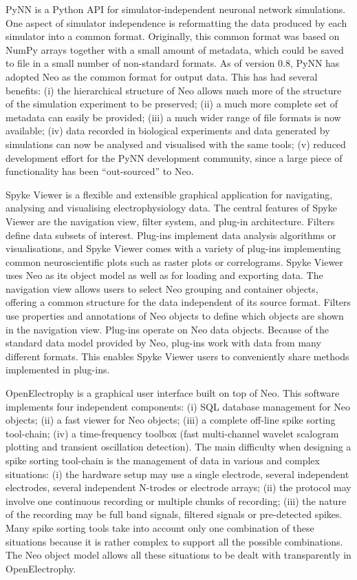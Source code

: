 \documentclass{frontiers}
\begin{document}
PyNN \citep{Davison2009} is a Python API for simulator-independent neuronal network simulations.
One aspect of simulator independence is reformatting the data produced by each simulator into a common format.
Originally, this common format was based on NumPy arrays together with a small amount of metadata, which could be saved to file in a small number of non-standard formats.
As of version 0.8, PyNN has adopted Neo as the common format for output data.
This has had several benefits:
  (i)   the hierarchical structure of Neo allows much more of the structure of the simulation experiment to be preserved;
  (ii)  a much more complete set of metadata can easily be provided;
  (iii) a much wider range of file formats is now available;
  (iv)  data recorded in biological experiments and data generated by simulations can now be analysed and visualised with the same tools; 
  (v)   reduced development effort for the PyNN development community, since a large piece of functionality has been ``out-sourced'' to Neo.

Spyke Viewer \citep{Proepper2013} is a flexible and extensible graphical application for navigating, analysing and visualising electrophysiology data. 
The central features of Spyke Viewer are the navigation view, filter system, and plug-in architecture.
Filters define data subsets of interest.
Plug-ins implement data analysis algorithms or visualisations, and Spyke Viewer comes with a variety of plug-ins implementing common neuroscientific plots such as raster plots or correlograms.
Spyke Viewer uses Neo as its object model as well as for loading and exporting data. 
The navigation view allows users to select Neo grouping and container objects, offering a common structure for the data independent of its source format.
Filters use properties and annotations of Neo objects to define which objects are shown in the navigation view.
Plug-ins operate on Neo data objects. Because of the standard data model provided by Neo, plug-ins work with data from many different formats. This enables Spyke Viewer users to conveniently share methods implemented in plug-ins.

OpenElectrophy \citep{Garcia2009} is a graphical user interface built on top of Neo. This software implements four independent components:
   (i) SQL database management for Neo objects;
   (ii) a fast viewer for Neo objects;
   (iii) a complete off-line spike sorting tool-chain;
   (iv) a time-frequency toolbox (fast multi-channel wavelet scalogram plotting and transient oscillation detection).
The main difficulty when designing a spike sorting tool-chain is the management of data in various and complex situations: 
   (i) the hardware setup may use a single electrode, several independent electrodes, several independent N-trodes or electrode arrays;
   (ii) the protocol may involve one continuous recording or multiple chunks of recording;
   (iii) the nature of the recording may be full band signals, filtered signals or pre-detected spikes.
Many spike sorting tools take into account only one combination of these situations because it is rather complex to support all the possible combinations. The Neo object model allows all these situations to be dealt with transparently in OpenElectrophy.
\end{document}
